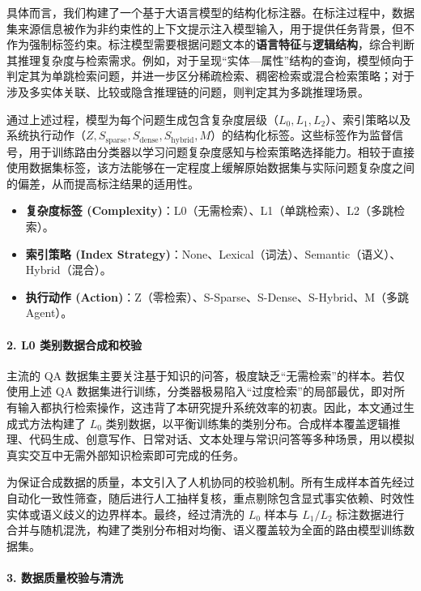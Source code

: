 具体而言，我们构建了一个基于大语言模型的结构化标注器。在标注过程中，数据集来源信息被作为非约束性的上下文提示注入模型输入，用于提供任务背景，但不作为强制标签约束。标注模型需要根据问题文本的\textbf{语言特征}与\textbf{逻辑结构}，综合判断其推理复杂度与检索需求。例如，对于呈现“实体—属性”结构的查询，模型倾向于判定其为单跳检索问题，并进一步区分稀疏检索、稠密检索或混合检索策略；对于涉及多实体关联、比较或隐含推理链的问题，则判定其为多跳推理场景。

通过上述过程，模型为每个问题生成包含复杂度层级（$L_0, L_1, L_2$）、索引策略以及系统执行动作（$Z, S_{\text{sparse}}, S_{\text{dense}}, S_{\text{hybrid}}, M$）的结构化标签。这些标签作为监督信号，用于训练路由分类器以学习问题复杂度感知与检索策略选择能力。相较于直接使用数据集标签，该方法能够在一定程度上缓解原始数据集与实际问题复杂度之间的偏差，从而提高标注结果的适用性。

\begin{itemize}
\item \textbf{复杂度标签 (Complexity)}：L0（无需检索）、L1（单跳检索）、L2（多跳检索）。
\item \textbf{索引策略 (Index Strategy)}：None、Lexical（词法）、Semantic（语义）、Hybrid（混合）。
\item \textbf{执行动作 (Action)}：Z（零检索）、S-Sparse、S-Dense、S-Hybrid、M（多跳 Agent）。
\end{itemize}

\paragraph{2. L0 类别数据合成和校验}
主流的 QA 数据集主要关注基于知识的问答，极度缺乏“无需检索”的样本。若仅使用上述 QA 数据集进行训练，分类器极易陷入“过度检索”的局部最优，即对所有输入都执行检索操作，这违背了本研究提升系统效率的初衷。因此，本文通过生成式方法构建了 $L_0$ 类别数据，以平衡训练集的类别分布。合成样本覆盖逻辑推理、代码生成、创意写作、日常对话、文本处理与常识问答等多种场景，用以模拟真实交互中无需外部知识检索即可完成的任务。

为保证合成数据的质量，本文引入了人机协同的校验机制。所有生成样本首先经过自动化一致性筛查，随后进行人工抽样复核，重点剔除包含显式事实依赖、时效性实体或语义歧义的边界样本。最终，经过清洗的 $L_0$ 样本与 $L_1/L_2$ 标注数据进行合并与随机混洗，构建了类别分布相对均衡、语义覆盖较为全面的路由模型训练数据集。

\paragraph{3. 数据质量校验与清洗}

